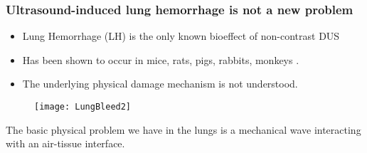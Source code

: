 \begin{frame} \frametitle{\vspace*{0.5cm}Ultrasound-induced lung hemorrhage is not a new problem}
  {\small%
    \begin{itemize}%
    \item Lung Hemorrhage (LH) is the only known bioeffect of non-contrast DUS%
    \item Has been shown to occur in mice, rats, pigs, rabbits, monkeys \citep{Child1990,OBrien1997a,Tarantal1994a}.%
    \item The underlying physical damage mechanism is not understood.%
    \end{itemize}%
    \begin{figure}%
      \centering%
      \texttt{[image: LungBleed2]} \nocite{Miller2012}%
    \end{figure}%
    The basic physical problem we have in the lungs is a mechanical wave interacting with an air-tissue interface.
  }
\end{frame}

